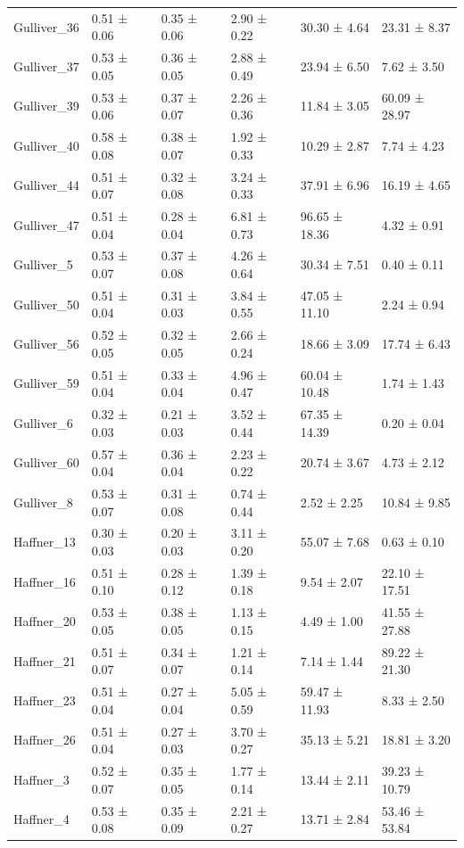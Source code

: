 \begin{tabular}{llllll}
Gulliver_36 & 0.51 ± 0.06 & 0.35 ± 0.06 & 2.90 ± 0.22 & 30.30 ± 4.64 & 23.31 ± 8.37 \\
Gulliver_37 & 0.53 ± 0.05 & 0.36 ± 0.05 & 2.88 ± 0.49 & 23.94 ± 6.50 & 7.62 ± 3.50 \\
Gulliver_39 & 0.53 ± 0.06 & 0.37 ± 0.07 & 2.26 ± 0.36 & 11.84 ± 3.05 & 60.09 ± 28.97 \\
Gulliver_40 & 0.58 ± 0.08 & 0.38 ± 0.07 & 1.92 ± 0.33 & 10.29 ± 2.87 & 7.74 ± 4.23 \\
Gulliver_44 & 0.51 ± 0.07 & 0.32 ± 0.08 & 3.24 ± 0.33 & 37.91 ± 6.96 & 16.19 ± 4.65 \\
Gulliver_47 & 0.51 ± 0.04 & 0.28 ± 0.04 & 6.81 ± 0.73 & 96.65 ± 18.36 & 4.32 ± 0.91 \\
Gulliver_5 & 0.53 ± 0.07 & 0.37 ± 0.08 & 4.26 ± 0.64 & 30.34 ± 7.51 & 0.40 ± 0.11 \\
Gulliver_50 & 0.51 ± 0.04 & 0.31 ± 0.03 & 3.84 ± 0.55 & 47.05 ± 11.10 & 2.24 ± 0.94 \\
Gulliver_56 & 0.52 ± 0.05 & 0.32 ± 0.05 & 2.66 ± 0.24 & 18.66 ± 3.09 & 17.74 ± 6.43 \\
Gulliver_59 & 0.51 ± 0.04 & 0.33 ± 0.04 & 4.96 ± 0.47 & 60.04 ± 10.48 & 1.74 ± 1.43 \\
Gulliver_6 & 0.32 ± 0.03 & 0.21 ± 0.03 & 3.52 ± 0.44 & 67.35 ± 14.39 & 0.20 ± 0.04 \\
Gulliver_60 & 0.57 ± 0.04 & 0.36 ± 0.04 & 2.23 ± 0.22 & 20.74 ± 3.67 & 4.73 ± 2.12 \\
Gulliver_8 & 0.53 ± 0.07 & 0.31 ± 0.08 & 0.74 ± 0.44 & 2.52 ± 2.25 & 10.84 ± 9.85 \\
Haffner_13 & 0.30 ± 0.03 & 0.20 ± 0.03 & 3.11 ± 0.20 & 55.07 ± 7.68 & 0.63 ± 0.10 \\
Haffner_16 & 0.51 ± 0.10 & 0.28 ± 0.12 & 1.39 ± 0.18 & 9.54 ± 2.07 & 22.10 ± 17.51 \\
Haffner_20 & 0.53 ± 0.05 & 0.38 ± 0.05 & 1.13 ± 0.15 & 4.49 ± 1.00 & 41.55 ± 27.88 \\
Haffner_21 & 0.51 ± 0.07 & 0.34 ± 0.07 & 1.21 ± 0.14 & 7.14 ± 1.44 & 89.22 ± 21.30 \\
Haffner_23 & 0.51 ± 0.04 & 0.27 ± 0.04 & 5.05 ± 0.59 & 59.47 ± 11.93 & 8.33 ± 2.50 \\
Haffner_26 & 0.51 ± 0.04 & 0.27 ± 0.03 & 3.70 ± 0.27 & 35.13 ± 5.21 & 18.81 ± 3.20 \\
Haffner_3 & 0.52 ± 0.07 & 0.35 ± 0.05 & 1.77 ± 0.14 & 13.44 ± 2.11 & 39.23 ± 10.79 \\
Haffner_4 & 0.53 ± 0.08 & 0.35 ± 0.09 & 2.21 ± 0.27 & 13.71 ± 2.84 & 53.46 ± 53.84 \\

\end{tabular}
